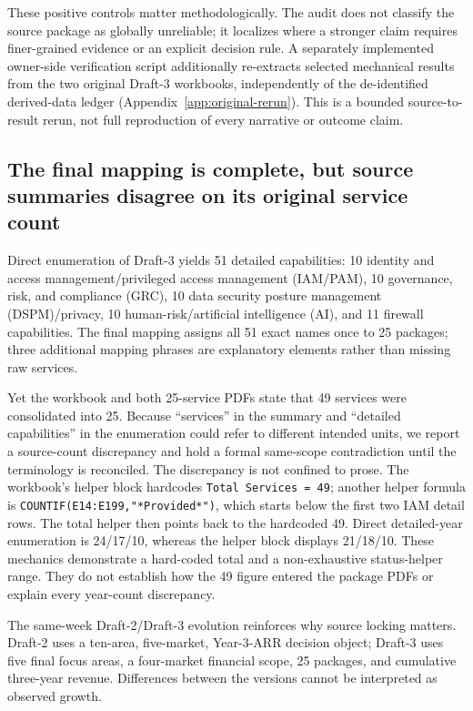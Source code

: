 \documentclass[systems,article,submit,moreauthors]{Definitions/mdpi}
\begin{document}
These positive controls matter methodologically. The audit does not classify the source package as globally unreliable; it localizes where a stronger claim requires finer-grained evidence or an explicit decision rule. A separately implemented owner-side verification script additionally re-extracts selected mechanical results from the two original Draft-3 workbooks, independently of the de-identified derived-data ledger (Appendix~\ref{app:original-rerun}). This is a bounded source-to-result rerun, not full reproduction of every narrative or outcome claim.

\subsection{The final mapping is complete, but source summaries disagree on its original service count}
Direct enumeration of Draft-3 yields 51 detailed capabilities: 10 identity and access management/privileged access management (IAM/PAM), 10 governance, risk, and compliance (GRC), 10 data security posture management (DSPM)/privacy, 10 human-risk/artificial intelligence (AI), and 11 firewall capabilities. The final mapping assigns all 51 exact names once to 25 packages; three additional mapping phrases are explanatory elements rather than missing raw services.

Yet the workbook and both 25-service PDFs state that 49 services were consolidated into 25. Because ``services'' in the summary and ``detailed capabilities'' in the enumeration could refer to different intended units, we report a source-count discrepancy and hold a formal same-scope contradiction until the terminology is reconciled. The discrepancy is not confined to prose. The workbook's helper block hardcodes \texttt{Total Services = 49}; another helper formula is \texttt{COUNTIF(E14:E199,"*Provided*")}, which starts below the first two IAM detail rows. The total helper then points back to the hardcoded 49. Direct detailed-year enumeration is 24/17/10, whereas the helper block displays 21/18/10. These mechanics demonstrate a hard-coded total and a non-exhaustive status-helper range. They do not establish how the 49 figure entered the package PDFs or explain every year-count discrepancy.

The same-week Draft-2/Draft-3 evolution reinforces why source locking matters. Draft-2 uses a ten-area, five-market, Year-3-ARR decision object; Draft-3 uses five final focus areas, a four-market financial scope, 25 packages, and cumulative three-year revenue. Differences between the versions cannot be interpreted as observed growth.
\end{document}
